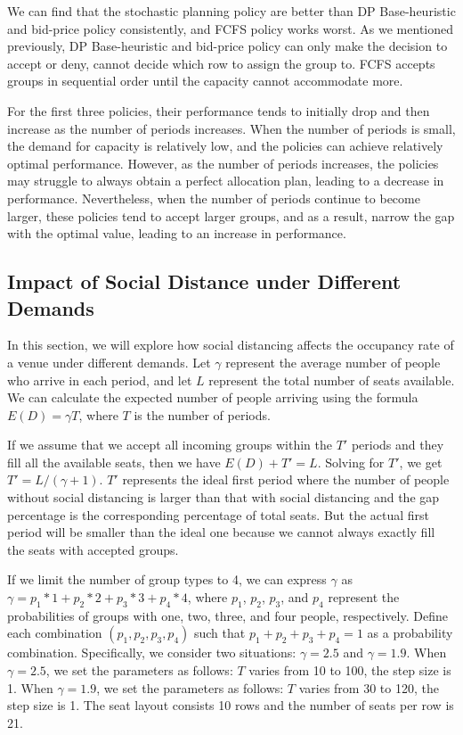 We can find that the stochastic planning policy are better than DP Base-heuristic and bid-price policy consistently, and FCFS policy works worst. As we mentioned previously, DP Base-heuristic and bid-price policy can only make the decision to accept or deny, cannot decide which row to assign the group to. FCFS accepts groups in sequential order until the capacity cannot accommodate more.


For the first three policies, their performance tends to initially drop and then increase as the number of periods increases. When the number of periods is small, the demand for capacity is relatively low, and the policies can achieve relatively optimal performance. However, as the number of periods increases, the policies may struggle to always obtain a perfect allocation plan, leading to a decrease in performance. Nevertheless, when the number of periods continue to become larger, these policies tend to accept larger groups, and as a result, narrow the gap with the optimal value, leading to an increase in performance.


\subsection{Impact of Social Distance under Different Demands}
In this section, we will explore how social distancing affects the occupancy rate of a venue under different demands. Let $\gamma$ represent the average number of people who arrive in each period, and let $L$ represent the total number of seats available. We can calculate the expected number of people arriving using the formula $E(D) = \gamma T$, where $T$ is the number of periods. 

If we assume that we accept all incoming groups within the $T{'}$ periods and they fill all the available seats, then we have $E(D) + T{'} = L$. Solving for $T{'}$, we get $T{'} = L/(\gamma + 1)$. 
$T{'}$ represents the ideal first period where the number of people without social distancing is larger than that with social distancing and the gap percentage is the corresponding percentage of total seats. But the actual first period will be smaller than the ideal one because we cannot always exactly fill the seats with accepted groups. 


If we limit the number of group types to 4, we can express $\gamma$ as $\gamma = p_1 * 1 + p_2 * 2 + p_3 * 3 + p_4 * 4$, where $p_1$, $p_2$, $p_3$, and $p_4$ represent the probabilities of groups with one, two, three, and four people, respectively. Define each combination $(p_1, p_2, p_3, p_4)$ such that $p_1 + p_2 + p_3 + p_4 = 1$ as a probability combination. Specifically, we consider two situations: $\gamma = 2.5$ and $\gamma = 1.9$. When $\gamma = 2.5$, we set the parameters as follows: $T$ varies from 10 to 100, the step size is 1. When $\gamma = 1.9$, we set the parameters as follows: $T$ varies from 30 to 120, the step size is 1. The seat layout consists 10 rows and the number of seats per row is 21.


